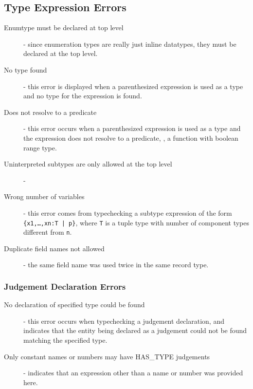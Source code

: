 \subsection{Type Expression Errors}

\begin{description}

\item[Enumtype must be declared at top level] - since enumeration types
are really just inline datatypes, they must be declared at the top level.

\item[No type found] - this error is displayed when a parenthesized
expression is used as a type and no type for the expression is found.

\item[Does not resolve to a predicate] - this error occurs when a
parenthesized expression is used as a type and the expression does not
resolve to a predicate, \ie, a function with boolean range type.

\item[Uninterpreted subtypes are only allowed at the top level] -

\item[Wrong number of variables] - this error comes from typechecking a
subtype expression of the form \texttt{\{x1,\ldots,xn:T | p\}}, where
\texttt{T} is a tuple type with number of component types different from
\texttt{n}.

\item[Duplicate field names not allowed] - the same field name was used
twice in the same record type.

\end{description}


\subsubsection{Judgement Declaration Errors}

\begin{description}

\item[No declaration of specified type could be found] - this error occurs
when typechecking a judgement declaration, and indicates that the entity
being declared as a judgement could not be found matching the specified
type.

\item[Only constant names or numbers may have HAS\_TYPE judgements] -
indicates that an expression other than a name or number was provided
here.

\end{description}


